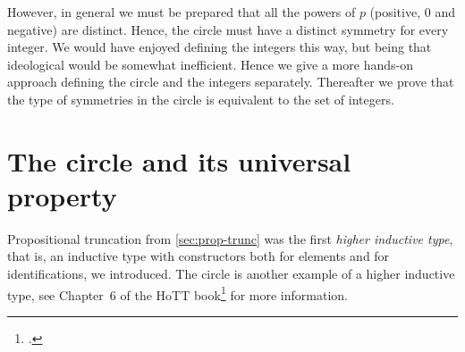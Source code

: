 However, in general we must be prepared that all the powers of $p$
(positive, $0$ and negative) are distinct.
Hence, the circle must have a distinct symmetry for every integer.
We would have enjoyed defining the integers this way,
but being that ideological would be somewhat inefficient.
Hence we give a more hands-on approach defining the circle
and the integers separately. Thereafter we prove that the type of
symmetries in the circle is equivalent to the set of integers.

\section{The circle and its universal property}
\label{sec:S1}

Propositional truncation from \cref{sec:prop-trunc} was
the first \emph{higher inductive type}, that is, an inductive type
with constructors both for elements and for identifications,
we introduced.
The circle is another example of a higher inductive type,
see Chapter~6 of the HoTT book\footcite{hottbook} for more information.

